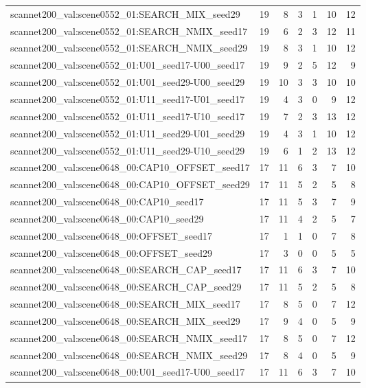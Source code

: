 \begin{table}[t]
\begin{tabular}{lrrrrrr}
scannet200\_val:scene0552\_01:SEARCH\_MIX\_seed29 & 19 & 8 & 3 & 1 & 10 & 12 \\
scannet200\_val:scene0552\_01:SEARCH\_NMIX\_seed17 & 19 & 6 & 2 & 3 & 12 & 11 \\
scannet200\_val:scene0552\_01:SEARCH\_NMIX\_seed29 & 19 & 8 & 3 & 1 & 10 & 12 \\
scannet200\_val:scene0552\_01:U01\_seed17-U00\_seed17 & 19 & 9 & 2 & 5 & 12 & 9 \\
scannet200\_val:scene0552\_01:U01\_seed29-U00\_seed29 & 19 & 10 & 3 & 3 & 10 & 10 \\
scannet200\_val:scene0552\_01:U11\_seed17-U01\_seed17 & 19 & 4 & 3 & 0 & 9 & 12 \\
scannet200\_val:scene0552\_01:U11\_seed17-U10\_seed17 & 19 & 7 & 2 & 3 & 13 & 12 \\
scannet200\_val:scene0552\_01:U11\_seed29-U01\_seed29 & 19 & 4 & 3 & 1 & 10 & 12 \\
scannet200\_val:scene0552\_01:U11\_seed29-U10\_seed29 & 19 & 6 & 1 & 2 & 13 & 12 \\
scannet200\_val:scene0648\_00:CAP10\_OFFSET\_seed17 & 17 & 11 & 6 & 3 & 7 & 10 \\
scannet200\_val:scene0648\_00:CAP10\_OFFSET\_seed29 & 17 & 11 & 5 & 2 & 5 & 8 \\
scannet200\_val:scene0648\_00:CAP10\_seed17 & 17 & 11 & 5 & 3 & 7 & 9 \\
scannet200\_val:scene0648\_00:CAP10\_seed29 & 17 & 11 & 4 & 2 & 5 & 7 \\
scannet200\_val:scene0648\_00:OFFSET\_seed17 & 17 & 1 & 1 & 0 & 7 & 8 \\
scannet200\_val:scene0648\_00:OFFSET\_seed29 & 17 & 3 & 0 & 0 & 5 & 5 \\
scannet200\_val:scene0648\_00:SEARCH\_CAP\_seed17 & 17 & 11 & 6 & 3 & 7 & 10 \\
scannet200\_val:scene0648\_00:SEARCH\_CAP\_seed29 & 17 & 11 & 5 & 2 & 5 & 8 \\
scannet200\_val:scene0648\_00:SEARCH\_MIX\_seed17 & 17 & 8 & 5 & 0 & 7 & 12 \\
scannet200\_val:scene0648\_00:SEARCH\_MIX\_seed29 & 17 & 9 & 4 & 0 & 5 & 9 \\
scannet200\_val:scene0648\_00:SEARCH\_NMIX\_seed17 & 17 & 8 & 5 & 0 & 7 & 12 \\
scannet200\_val:scene0648\_00:SEARCH\_NMIX\_seed29 & 17 & 8 & 4 & 0 & 5 & 9 \\
scannet200\_val:scene0648\_00:U01\_seed17-U00\_seed17 & 17 & 11 & 6 & 3 & 7 & 10 \\

\end{tabular}
\end{table}
